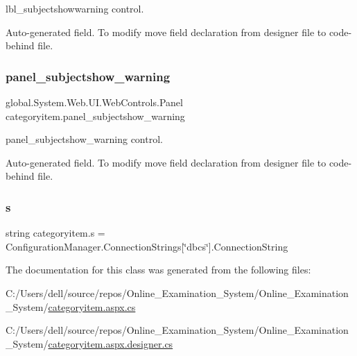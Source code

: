 lbl\+\_\+subjectshowwarning control. 

Auto-\/generated field. To modify move field declaration from designer file to code-\/behind file. \mbox{\label{classcategoryitem_a635ebf5d186919af0716316b82d559d5}} 
\subsubsection{\texorpdfstring{panel\_subjectshow\_warning}{panel\_subjectshow\_warning}}
{\footnotesize\ttfamily global.\+System.\+Web.\+U\+I.\+Web\+Controls.\+Panel categoryitem.\+panel\+\_\+subjectshow\+\_\+warning\hspace{0.3cm}{\ttfamily [protected]}}



panel\+\_\+subjectshow\+\_\+warning control. 

Auto-\/generated field. To modify move field declaration from designer file to code-\/behind file. \mbox{\label{classcategoryitem_a05d1b5370e49dd0bc3099c75aa96fa2c}} 
\subsubsection{\texorpdfstring{s}{s}}
{\footnotesize\ttfamily string categoryitem.\+s = Configuration\+Manager.\+Connection\+Strings\mbox{[}\char`\"{}dbcs\char`\"{}\mbox{]}.Connection\+String\hspace{0.3cm}{\ttfamily [private]}}



The documentation for this class was generated from the following files\+:\begin{DoxyCompactItemize}
\item 
C\+:/\+Users/dell/source/repos/\+Online\+\_\+\+Examination\+\_\+\+System/\+Online\+\_\+\+Examination\+\_\+\+System/\mbox{\hyperlink{categoryitem_8aspx_8cs}{categoryitem.\+aspx.\+cs}}\item 
C\+:/\+Users/dell/source/repos/\+Online\+\_\+\+Examination\+\_\+\+System/\+Online\+\_\+\+Examination\+\_\+\+System/\mbox{\hyperlink{categoryitem_8aspx_8designer_8cs}{categoryitem.\+aspx.\+designer.\+cs}}\end{DoxyCompactItemize}
